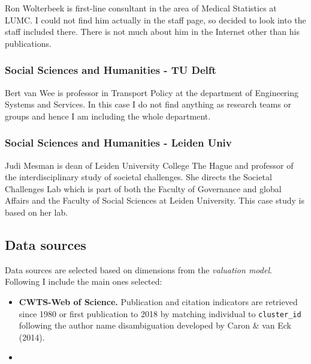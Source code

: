 \documentclass[]{elsarticle} %
\begin{document}
Ron Wolterbeek is first-line consultant in the area of Medical
Statistics at LUMC. I could not find him actually in the staff page, so
decided to look into the staff included there. There is not much about
him in the Internet other than his publications.

\hypertarget{social-sciences-and-humanities---tu-delft}{%
\subsubsection{Social Sciences and Humanities - TU
Delft}\label{social-sciences-and-humanities---tu-delft}}

Bert van Wee is professor in Transport Policy at the department of
Engineering Systems and Services. In this case I do not find anything as
research teams or groups and hence I am including the whole department.

\hypertarget{social-sciences-and-humanities---leiden-univ}{%
\subsubsection{Social Sciences and Humanities - Leiden
Univ}\label{social-sciences-and-humanities---leiden-univ}}

Judi Mesman is dean of Leiden University College The Hague and professor
of the interdisciplinary study of societal challenges. She directs the
Societal Challenges Lab which is part of both the Faculty of Governance
and global Affairs and the Faculty of Social Sciences at Leiden
University. This case study is based on her lab.

\hypertarget{data-sources}{%
\subsection{Data sources}\label{data-sources}}

Data sources are selected based on dimensions from the \emph{valuation
model}. Following I include the main ones selected:

\begin{itemize}
\item
  \textbf{CWTS-Web of Science.} Publication and citation indicators are
  retrieved since 1980 or first publication to 2018 by matching
  individual to \texttt{cluster\_id} following the author name
  disambiguation developed by Caron \& van Eck (2014).
\item
\end{itemize}
\end{document}
